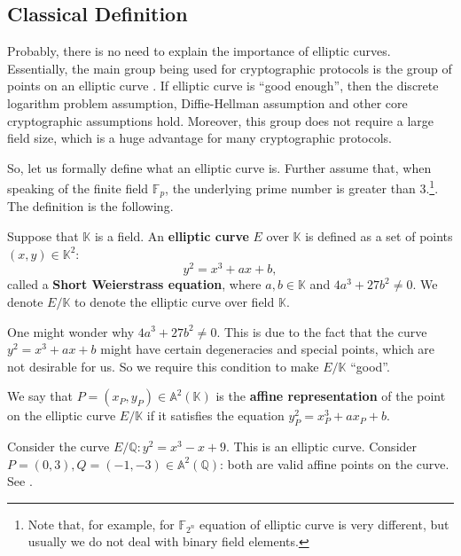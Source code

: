 \documentclass[../lecture-notes-148x210.tex]{subfiles}
\begin{document}
\subsection{Classical Definition}

Probably, there is no need to explain the importance of elliptic curves. Essentially, the main group being used for cryptographic 
protocols is the group of points on an elliptic curve \cite[section 13]{Cohen_Frey_2005} \cite[section 9]{Galbraith_2012}. If elliptic curve is ``good enough'', then the discrete logarithm problem assumption,
Diffie-Hellman assumption and other core cryptographic assumptions hold. Moreover, this group does not require
a large field size, which is a huge advantage for many cryptographic protocols.

So, let us formally define what an elliptic curve is. Further assume that, when speaking of the finite field $\mathbb{F}_p$, the underlying prime number is greater than $3$.\footnote{Note that, for example, for $\mathbb{F}_{2^n}$ equation of elliptic curve is very different, but usually we do not deal with binary field elements.}. The definition is the following.

\begin{definition}
    Suppose that $\mathbb{K}$ is a field. An \textbf{elliptic curve} $E$ over $\mathbb{K}$ is defined as a set of points $(x,y) \in \mathbb{K}^2$:
    \begin{equation*}
        y^2 = x^3+ax+b,
    \end{equation*}
    called a \textbf{Short Weierstrass equation}, where $a,b \in \mathbb{K}$ and $4a^3+27b^2 \neq 0$. We denote $E/\mathbb{K}$ to denote the elliptic curve over field $\mathbb{K}$.
\end{definition}

\begin{remark}
    One might wonder why $4a^3+27b^2 \neq 0$. This is due to the fact that the curve $y^2=x^3+ax+b$ might have certain degeneracies and special points, which are not desirable for us. So we require this condition to make $E/\mathbb{K}$ ``good''.
\end{remark}

\begin{definition}
    We say that $P=(x_P,y_P) \in \mathbb{A}^2(\mathbb{K})$ is the \textbf{affine representation} of the point on the elliptic curve $E/\mathbb{K}$ if it satisfies the equation $y_P^2=x_P^3+ax_P+b$.
\end{definition}

\begin{example}
    Consider the curve $E/\mathbb{Q}: y^2=x^3-x+9$. This is an elliptic curve. Consider $P=(0,3), Q=(-1,-3) \in \mathbb{A}^2(\mathbb{Q})$: both are valid affine points on the curve. See .
\end{example}
\end{document}
